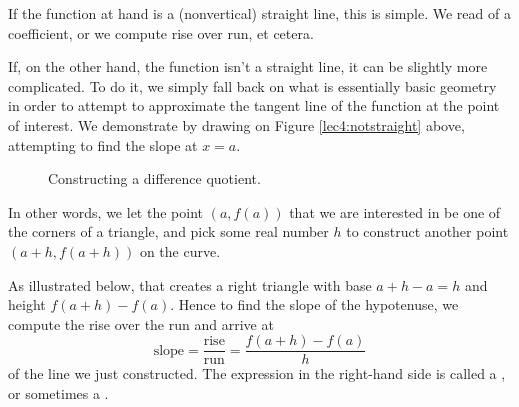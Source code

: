 \noindent
If the function at hand is a (nonvertical) straight line, this is simple.
We read of a coefficient, or we compute rise over run, et cetera.

If, on the other hand, the function isn't a straight line, it can be slightly more complicated.
To do it, we simply fall back on what is essentially basic geometry in order to attempt to approximate the tangent line of the function at the point of interest.
We demonstrate by drawing on Figure \ref{lec4:notstraight} above, attempting to find the slope at $x = a$.

\begin{figure}
	\centering
	\hfill
	\caption{Constructing a difference quotient.}
\end{figure}

In other words, we let the point $(a, f(a))$ that we are interested in be one of the corners of a triangle, and pick some real number $h$ to construct another point $(a + h, f(a + h))$ on the curve.

As illustrated below, that creates a right triangle with base $a + h - a = h$ and height $f(a + h) - f(a)$. Hence to find the slope of the hypotenuse, we compute the rise over the run and arrive at
\[
	\text{slope} = \frac{\text{rise}}{\text{run}} = \frac{f(a + h) - f(a)}{h}
\]
of the line we just constructed.
The expression in the right-hand side is called a , or sometimes a .

